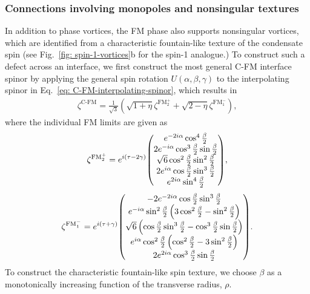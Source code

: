 \subsubsection{Connections involving monopoles and nonsingular textures}
In addition to phase vortices, the FM phase also supports nonsingular vortices,
which are identified from a characteristic fountain-like texture of
the condensate spin (see Fig.~\ref{fig: spin-1-vortices}b for the spin-1
analogue.)
To construct such a defect across an interface, we first construct the most
general C-FM interface spinor by applying the general spin rotation
\(U(\alpha, \beta, \gamma)\) to the interpolating spinor in
Eq.~\eqref{eq: C-FM-interpolating-spinor}, which results in
\begin{align}\label{eq: C-FM-coreless-general}
    \zeta^\text{C-FM} = \frac{1}{\sqrt{3}}\left(
        \sqrt{1 + \eta}\zeta^{\text{FM}_2^+}
        + \sqrt{2 - \eta}\zeta^{\text{FM}_1^-}
    \right),
\end{align}
where the individual FM limits are given as
\begin{align}\label{eq: FM-2-coreless}
    \zeta^{\text{FM}_2^+} =e^{i(\tau-2\gamma)}
    \mqty(
    e^{-2i\alpha}\cos^4\frac{\beta}{2} \\
    2e^{-i\alpha}\cos^3\frac{\beta}{2}\sin\frac{\beta}{2}  \\
    \sqrt{6}\cos^2\frac{\beta}{2}\sin^2\frac{\beta}{2} \\
    2e^{i\alpha}\cos\frac{\beta}{2}\sin^3\frac{\beta}{2} \\
    e^{2i\alpha}\sin^4\frac{\beta}{2}
    ),
\end{align}
\begin{align}\label{eq: FM-1-coreless}
    \zeta^{\text{FM}_1^-} = e^{i(\tau + \gamma)}
    \mqty(
    -2e^{-2i\alpha}\cos\frac{\beta}{2}\sin^3\frac{\beta}{2} \\
    e^{-i\alpha}\sin^2\frac{\beta}{2}\left(
        3\cos^2\frac{\beta}{2} -\sin^2\frac{\beta}{2}
    \right) \\
    \sqrt{6}\left(
        \cos\frac{\beta}{2}\sin^3\frac{\beta}{2}
        - \cos^3\frac{\beta}{2}\sin\frac{\beta}{2}
    \right) \\
    e^{i\alpha}\cos^2\frac{\beta}{2}\left(
        \cos^2\frac{\beta}{2}-3\sin^2\frac{\beta}{2}
    \right) \\
    2e^{2i\alpha}\cos^3\frac{\beta}{2}\sin\frac{\beta}{2}
    ).
\end{align}
To construct the characteristic fountain-like spin texture, we choose \(\beta\)
as a monotonically increasing function of the transverse radius, \(\rho\).
